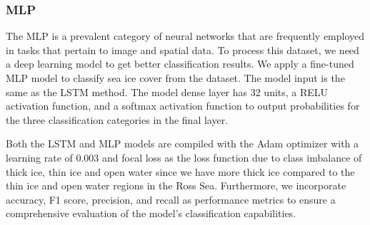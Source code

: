 %

\subsubsection{MLP}
The MLP \cite{riedmiller2014multi} is a prevalent category of neural networks that are frequently employed in tasks that pertain to image and spatial data. To process this dataset, we need a deep learning model to get better classification results. 
%
We apply a fine-tuned MLP model to classify sea ice cover from the dataset. The model input is the same as the LSTM method. The model dense layer has 32 units, a RELU activation function, and a softmax activation function to output probabilities for the three classification categories in the final layer. 
%

Both the LSTM and MLP models are compiled with the Adam optimizer with a learning rate of 0.003 and focal loss as the loss function due to class imbalance of thick ice, thin ice and open water since we have more thick ice compared to the thin ice and open water regions in the Ross Sea.
Furthermore, we incorporate accuracy, F1 score, precision, and recall as performance metrics to ensure a comprehensive evaluation of the model’s classification capabilities. 




